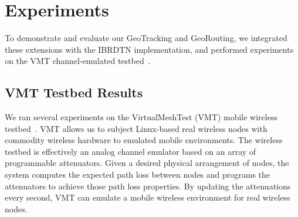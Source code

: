 \section{Experiments}\label{sec:experiments}
To demonstrate and evaluate our GeoTracking and GeoRouting, 
we integrated these extensions with the IBRDTN implementation, and performed experiments on 
the VMT channel-emulated testbed~\cite{hahn10:using, kim11:reality}.  


\subsection{VMT Testbed Results}\label{sec:vmtresults}
We ran several experiments on the VirtualMeshTest (VMT)
mobile wireless testbed~\cite{hahn10:using, kim11:reality}.
VMT allows us to subject Linux-based real wireless nodes with commodity 
wireless hardware to emulated mobile environments.  The 
wireless testbed is effectively an analog channel emulator based
on an array of programmable attenuators.  Given a desired physical arrangement
of nodes, the system computes the expected path loss between
nodes and programs the attenuators to achieve those path loss
properties.  By updating the attenuations every second, VMT can
emulate a mobile wireless environment for real wireless nodes.

